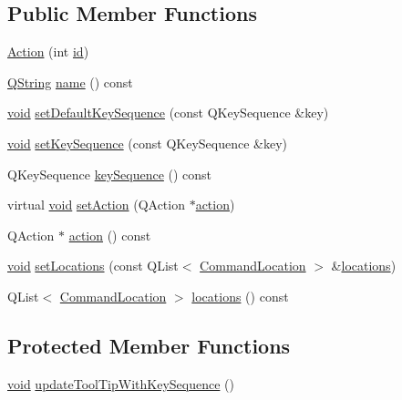 \subsection*{\-Public \-Member \-Functions}
\begin{DoxyCompactItemize}
\item 
\hyperlink{group___core_plugin_ga1cf8a6592c0894b3ae9bf66cfe62f963}{\-Action} (int \hyperlink{group___core_plugin_gac039f1f888e5c7bd1a5d46458aeb1610}{id})
\item 
\hyperlink{group___u_a_v_objects_plugin_gab9d252f49c333c94a72f97ce3105a32d}{\-Q\-String} \hyperlink{group___core_plugin_ga93e449c5b7915f96cd811f0708f5c0ed}{name} () const 
\item 
\hyperlink{group___u_a_v_objects_plugin_ga444cf2ff3f0ecbe028adce838d373f5c}{void} \hyperlink{group___core_plugin_gaebb2eaae5b25ede83b091bca36053c49}{set\-Default\-Key\-Sequence} (const \-Q\-Key\-Sequence \&key)
\item 
\hyperlink{group___u_a_v_objects_plugin_ga444cf2ff3f0ecbe028adce838d373f5c}{void} \hyperlink{group___core_plugin_ga2f2036ff2277520d4e7c6371230449b8}{set\-Key\-Sequence} (const \-Q\-Key\-Sequence \&key)
\item 
\-Q\-Key\-Sequence \hyperlink{group___core_plugin_gac8fd65c5ff232ae1f16eab655bbb3612}{key\-Sequence} () const 
\item 
virtual \hyperlink{group___u_a_v_objects_plugin_ga444cf2ff3f0ecbe028adce838d373f5c}{void} \hyperlink{group___core_plugin_ga2650c3668e5d5c5678fa339e58e151cc}{set\-Action} (\-Q\-Action $\ast$\hyperlink{group___core_plugin_gaad3b2792dc4533f93c529fe55dcc26e8}{action})
\item 
\-Q\-Action $\ast$ \hyperlink{group___core_plugin_gaad3b2792dc4533f93c529fe55dcc26e8}{action} () const 
\item 
\hyperlink{group___u_a_v_objects_plugin_ga444cf2ff3f0ecbe028adce838d373f5c}{void} \hyperlink{group___core_plugin_ga17614acfea1ff2dea3d95a6dcb751589}{set\-Locations} (const \-Q\-List$<$ \hyperlink{struct_command_location}{\-Command\-Location} $>$ \&\hyperlink{group___core_plugin_gad3e84fff2961dfdec8ee7d84e09ad61d}{locations})
\item 
\-Q\-List$<$ \hyperlink{struct_command_location}{\-Command\-Location} $>$ \hyperlink{group___core_plugin_gad3e84fff2961dfdec8ee7d84e09ad61d}{locations} () const 
\end{DoxyCompactItemize}
\subsection*{\-Protected \-Member \-Functions}
\begin{DoxyCompactItemize}
\item 
\hyperlink{group___u_a_v_objects_plugin_ga444cf2ff3f0ecbe028adce838d373f5c}{void} \hyperlink{group___core_plugin_gaf1e48d2af090ec10cf6d278b8dd41b23}{update\-Tool\-Tip\-With\-Key\-Sequence} ()
\end{DoxyCompactItemize}
